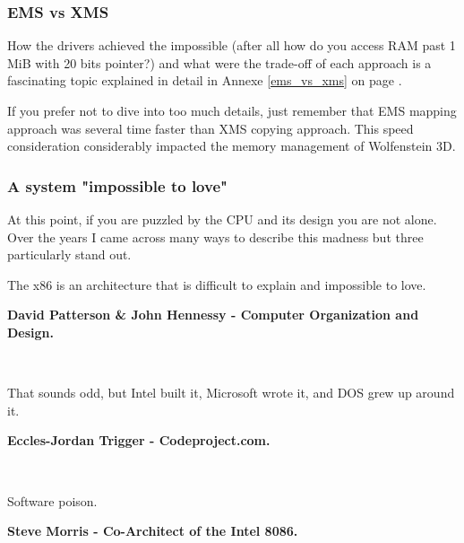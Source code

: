 \documentclass[book.tex]{subfiles}
\begin{document}
\subsubsection{EMS vs XMS}
How the drivers achieved the impossible (after all how do you access RAM past 1 MiB with 20 bits pointer?) and what were the trade-off of each approach is a fascinating topic explained in detail in Annexe \ref{ems_vs_xms} on page \pageref{ems_vs_xms}.\\
\par
 If you prefer not to dive into too much details, just remember that EMS mapping approach was several time faster than XMS copying approach. This speed consideration considerably impacted the memory management of Wolfenstein 3D.




\subsubsection{A system "impossible to love"}
At this point, if you are puzzled by the CPU and its design you are not alone. Over the years I came across many ways to describe this madness but three particularly stand out.\\

\par
 \begin{fancyquotes}
   The x86 is an architecture that is difficult to explain and impossible to love.\\
   \par
\textbf{David Patterson \& John Hennessy - Computer Organization and Design.}
 \end{fancyquotes}\\

\par

\par
 \begin{fancyquotes}
    That sounds odd, but Intel built it, Microsoft wrote it, and DOS grew up around it.\\
   \par
\textbf{Eccles-Jordan Trigger - Codeproject.com.}
 \end{fancyquotes}\\
\par
 \begin{fancyquotes}
    Software poison.\\
   \par
\textbf{Steve Morris - Co-Architect of the Intel 8086.}
 \end{fancyquotes}\\
\end{document}
